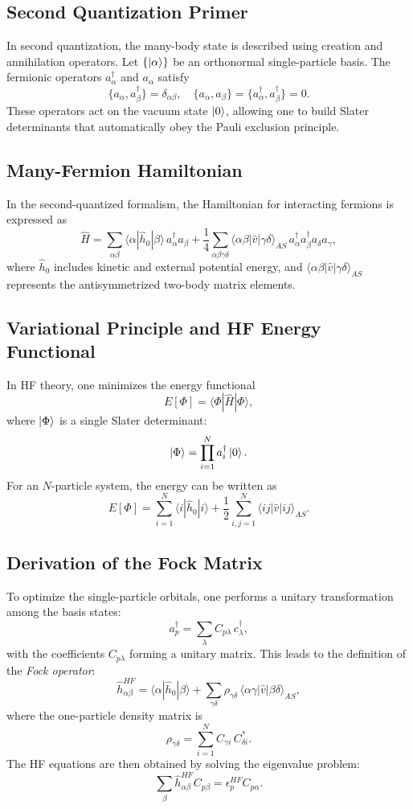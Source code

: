 \subsection{Second Quantization Primer}
In second quantization, the many-body state is described using creation and annihilation operators. Let $\{\ket{\alpha}\}$ be an orthonormal single-particle basis. The fermionic operators $a_\alpha^\dagger$ and $a_\alpha$ satisfy
\[
\{a_\alpha, a_\beta^\dagger\} = \delta_{\alpha\beta}, \quad \{a_\alpha, a_\beta\} = \{a_\alpha^\dagger, a_\beta^\dagger\} = 0.
\]
These operators act on the vacuum state $\ket{0}$, allowing one to build Slater determinants that automatically obey the Pauli exclusion principle.

\subsection{Many-Fermion Hamiltonian}
In the second-quantized formalism, the Hamiltonian for interacting fermions is expressed as
\[
\hat{H} = \sum_{\alpha\beta} \langle \alpha | \hat{h}_0 | \beta \rangle\, a_\alpha^\dagger a_\beta + \frac{1}{4} \sum_{\alpha\beta\gamma\delta} \langle \alpha \beta | \hat{v} | \gamma \delta \rangle_{\!AS}\, a_\alpha^\dagger a_\beta^\dagger a_\delta a_\gamma,
\]
where $\hat{h}_0$ includes kinetic and external potential energy, and $\langle \alpha \beta | \hat{v} | \gamma \delta \rangle_{\!AS}$ represents the antisymmetrized two-body matrix elements.

\subsection{Variational Principle and HF Energy Functional}
In HF theory, one minimizes the energy functional
\[
E[\Phi] = \langle \Phi | \hat{H} | \Phi \rangle,
\]
where $\ket{\Phi}$ is a single Slater determinant:
\[
\ket{\Phi} = \prod_{i=1}^N a_i^\dagger \ket{0}.
\]
For an $N$-particle system, the energy can be written as
\[
E[\Phi] = \sum_{i=1}^N \langle i | \hat{h}_0 | i \rangle + \frac{1}{2}\sum_{i,j=1}^N \langle ij | \hat{v} | ij \rangle_{\!AS}.
\]

\subsection{Derivation of the Fock Matrix}
To optimize the single-particle orbitals, one performs a unitary transformation among the basis states:
\[
a_p^\dagger = \sum_\lambda C_{p\lambda}\, c_\lambda^\dagger,
\]
with the coefficients $C_{p\lambda}$ forming a unitary matrix. This leads to the definition of the \emph{Fock operator}:
\[
\hat{h}^{HF}_{\alpha\beta} = \langle \alpha | \hat{h}_0 | \beta \rangle + \sum_{\gamma\delta} \rho_{\gamma\delta}\, \langle \alpha \gamma | \hat{v} | \beta \delta \rangle_{\!AS},
\]
where the one-particle density matrix is
\[
\rho_{\gamma\delta} = \sum_{i=1}^N C_{\gamma i}\, C_{\delta i}^*.
\]
The HF equations are then obtained by solving the eigenvalue problem:
\[
\sum_\beta \hat{h}^{HF}_{\alpha\beta} C_{p\beta} = \epsilon_p^{HF} C_{p\alpha}.
\]

